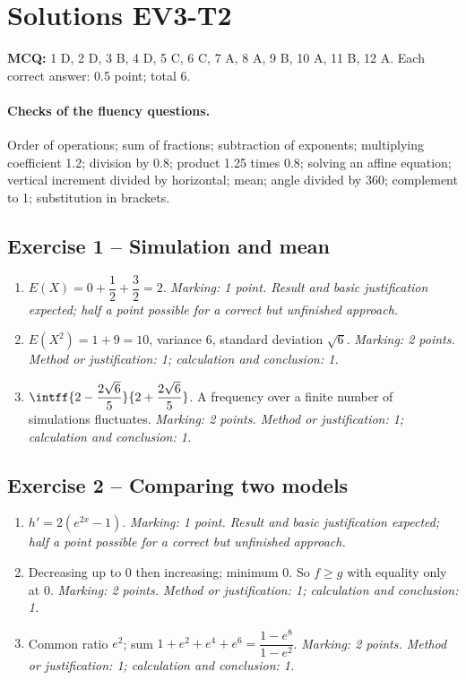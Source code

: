 \mxnewpage\section*{Solutions EV3-T2}\label{EV3-T2-CORR}
\textbf{MCQ:} 1 D, 2 D, 3 B, 4 D, 5 C, 6 C, 7 A, 8 A, 9 B, 10 A, 11 B, 12 A. Each correct answer: \num{0,5} point; total 6.
\paragraph{Checks of the fluency questions.} Order of operations; sum of fractions; subtraction of exponents; multiplying coefficient \num{1,2}; division by \num{0,8}; product \num{1,25} times \num{0,8}; solving an affine equation; vertical increment divided by horizontal; mean; angle divided by 360; complement to 1; substitution in brackets.
\subsection*{Exercise 1 -- Simulation and mean}
\begin{enumerate}
\item $E(X)=0+\dfrac{1}{2}+\dfrac{3}{2}=2$. \textit{Marking: 1 point. Result and basic justification expected; half a point possible for a correct but unfinished approach.}
\item $E(X^2)=1+9=10$, variance 6, standard deviation $\sqrt6$. \textit{Marking: 2 points. Method or justification: 1; calculation and conclusion: 1.}
\item $\intff{2-\dfrac{2\sqrt 6}{5}}{2+\dfrac{2\sqrt 6}{5}}$. A frequency over a finite number of simulations fluctuates. \textit{Marking: 2 points. Method or justification: 1; calculation and conclusion: 1.}
\end{enumerate}
\subsection*{Exercise 2 -- Comparing two models}
\begin{enumerate}
\item $h\prime=2(e^{2x}-1)$. \textit{Marking: 1 point. Result and basic justification expected; half a point possible for a correct but unfinished approach.}
\item Decreasing up to 0 then increasing; minimum 0. So $f\geq g$ with equality only at 0. \textit{Marking: 2 points. Method or justification: 1; calculation and conclusion: 1.}
\item Common ratio $e^2$; sum $1+e^2+e^4+e^6=\dfrac{1-e^8}{1-e^2}$. \textit{Marking: 2 points. Method or justification: 1; calculation and conclusion: 1.}
\end{enumerate}
